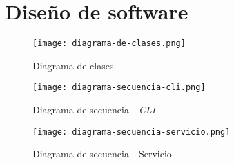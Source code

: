 \section{Diseño de software} \label{sec:dis}

    \begin{figure}[h!]
    \centering
        \texttt{[image: diagrama-de-clases.png]}
        \caption{Diagrama de clases}
        \label{fig:class-diagram}
    \end{figure}

    \begin{figure}[h!]
    \centering
        \texttt{[image: diagrama-secuencia-cli.png]}
        \caption{Diagrama de secuencia - \textit{CLI}}
        \label{fig:sequence-diagram-cli}
    \end{figure}
    
    \begin{figure}[h!]
    \centering
        \texttt{[image: diagrama-secuencia-servicio.png]}
        \caption{Diagrama de secuencia - Servicio}
        \label{fig:sequence-diagram-service}
    \end{figure}
